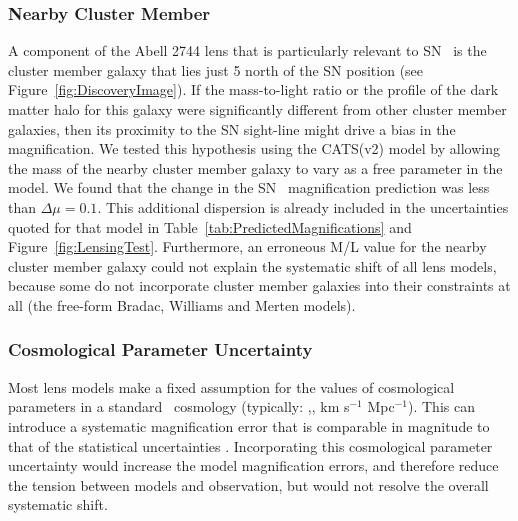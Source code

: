 \subsubsection{Nearby Cluster Member}
A component of the Abell 2744 lens that is particularly relevant to SN \tomas\ is the cluster member
galaxy that lies just 5 north of the SN position (see
Figure~\ref{fig:DiscoveryImage}).  If the mass-to-light ratio or the
profile of the dark matter halo for this galaxy were significantly
different from other cluster member galaxies, then its
proximity to the SN sight-line might drive a bias in the magnification.
We tested this hypothesis using the CATS(v2) model by allowing the mass
of the nearby cluster member galaxy to vary as a free parameter in the
model. We found that the change in the SN \tomas\ magnification
prediction was less than $\Delta\mu=0.1$.  This additional dispersion
is already included in the uncertainties quoted for that model in
Table~\ref{tab:PredictedMagnifications} and
Figure~\ref{fig:LensingTest}.  Furthermore, an erroneous M/L
value for the nearby cluster member galaxy could not explain the
systematic shift of all lens models, because some do not incorporate
cluster member galaxies into their constraints at all (the free-form
Bradac, Williams and Merten models).


\subsubsection{Cosmological Parameter Uncertainty}
Most lens models make a
fixed assumption for the values of cosmological parameters in a
standard \LCDM\ cosmology (typically: ,, km
s$^{-1}$ Mpc$^{-1}$). This can introduce a systematic magnification
error that is comparable in magnitude to that of the statistical
uncertainties \citep{Zitrin:2014b,Bayliss:2015}.  
Incorporating this
cosmological parameter uncertainty would increase the model magnification 
errors, and therefore reduce the tension between models and observation, but would not
resolve the overall systematic shift.   


